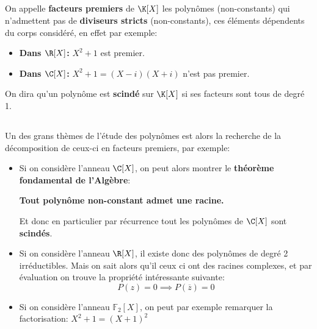 \subsection*{}
On appelle \textbf{facteurs premiers} de \( \K[X]\) les polynômes (non-constants) qui n'admettent pas de \textbf{diviseurs stricts} (non-constants), ces éléments dépendents du corps considéré, en effet par exemple:
\begin{itemize}
   \item \textbf{Dans \( \R[X] \):} \(X^2 + 1\) est premier.
   \item \textbf{Dans \( \C[X] \):} \(X^2 + 1 = (X - i)(X + i)\) n'est pas premier.
\end{itemize}
On dira qu'un polynôme est \textbf{scindé} sur \( \K[X] \) si ses facteurs sont tous de degré 1.
\subsection*{}
Un des grans thèmes de l'étude des polynômes est alors la recherche de la décomposition de ceux-ci en facteurs premiers, par exemple: 

\begin{itemize}
   \item Si on considère l'anneau \( \C[X] \), on peut alors montrer le \textbf{théorème fondamental de l'Algèbre}:
   \begin{center}
      \textbf{Tout polynôme non-constant admet une racine.}
   \end{center}
   Et donc en particulier par récurrence tout les polynômes de \( \C[X] \) sont \textbf{scindés}.
   \item Si on considère l'anneau \( \R[X] \), il existe donc des polynômes de degré 2 irréductibles. Mais on sait alors qu'il ceux ci ont des racines complexes, et par évaluation on trouve la propriété intéressante suivante:
   \[
      P(z) = 0 \implies P(\overline{z}) = 0
   \]
   \item Si on considère l'anneau \( \mathbb{F}_2[X] \), on peut par exemple remarquer la factorisation:
   \(
      X^2 + 1 = (X + 1)^2 
   \)
\end{itemize}
